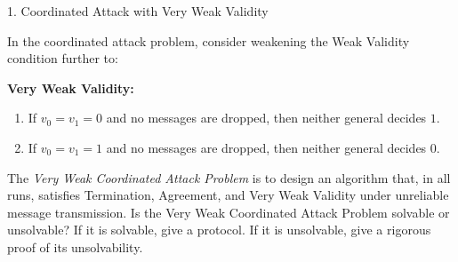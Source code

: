 \documentclass[12pt]{article}
\begin{document}


\begin{problem}{1. Coordinated Attack with Very Weak Validity}

    In the coordinated attack problem, consider weakening the Weak Validity condition further to:
    \begin{tcolorbox}
        \textbf{Very Weak Validity:}
        \begin{enumerate}
            \item[(0)] If $v_0 = v_1 = 0$ and no messages are dropped, then neither general decides $1$.
            \item[(1)] If $v_0 = v_1 = 1$ and no messages are dropped, then neither general decides $0$.
        \end{enumerate}
    \end{tcolorbox}
    The \emph{Very Weak Coordinated Attack Problem} is to design an algorithm that, in all runs, satisfies Termination, Agreement, and Very Weak Validity under unreliable message transmission.
    Is the Very Weak Coordinated Attack Problem solvable or unsolvable? If it is solvable, give a protocol. If it is unsolvable, give a rigorous proof of its unsolvability.
\end{problem}
\end{document}
